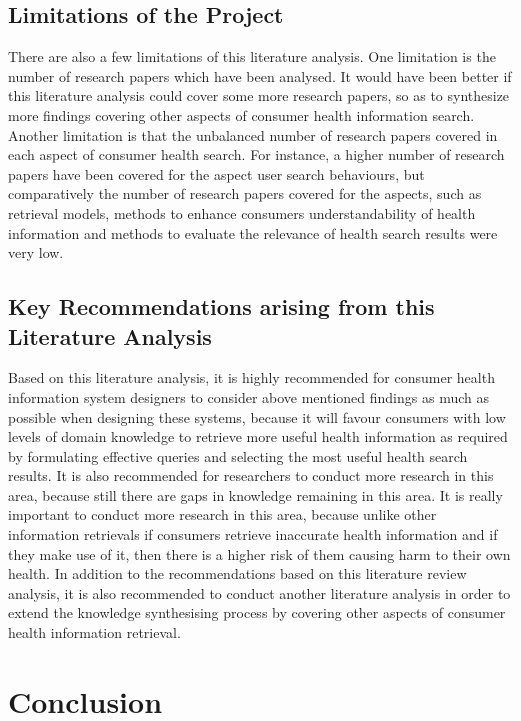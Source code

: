 \documentclass[]{article}
\begin{document}
\subsection{Limitations of the Project}

There are also a few limitations of this literature analysis. One limitation is the number of research papers which have been analysed. It would have been better if this literature analysis could cover some more research papers, so as to synthesize more findings covering other aspects of consumer health information search. Another limitation is that the unbalanced number of research papers covered in each aspect of consumer health search. For instance, a higher number of research papers have been covered for the aspect \textquotesingle user search behaviours\textquotesingle, but comparatively the number of research papers covered for the aspects, such as retrieval models, methods to enhance consumers understandability of health information and methods to evaluate the relevance of health search results were very low. \\

\subsection{Key Recommendations arising from this Literature Analysis}

Based on this literature analysis, it is highly recommended for consumer health information system designers to consider above mentioned findings as much as possible when designing these systems, because it will favour consumers with low levels of domain knowledge to retrieve more useful health information as required by formulating effective queries and selecting the most useful health search results. It is also recommended for researchers to conduct more research in this area, because still there are gaps in knowledge remaining in this area. It is really important to conduct more research in this area, because unlike other information retrievals if consumers retrieve inaccurate health information and if they make use of it, then there is a higher risk of them causing harm to their own health. In addition to the recommendations based on this literature review analysis, it is also recommended to conduct another literature analysis in order to extend the knowledge synthesising process by covering other aspects of consumer health information retrieval.  

\pagebreak

\section{Conclusion}
\end{document}
